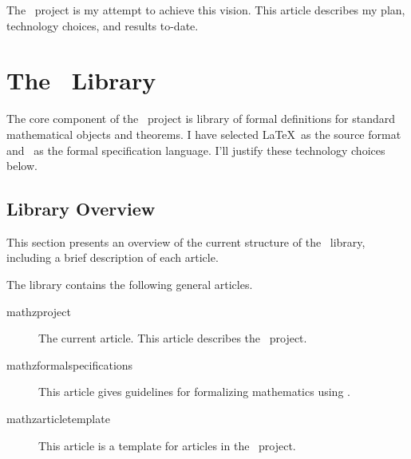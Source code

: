 \documentclass{amsart}
\begin{document}
The \mathz\ project is my attempt to achieve this vision.
This article describes my plan, technology choices, and results to-date.

\section{The \mathz\ Library}

The core component of the \mathz\ project is library of formal definitions for standard mathematical objects and theorems.
I have selected \LaTeX\ as the source format and \ZN\ as the formal specification language.
I'll justify these technology choices below.

\subsection{Library Overview}

This section presents an overview of the current structure of the \mathz\ library, 
including a brief description of each article.

The library contains the following general articles.
\begin{description}
\item[mathz\-project] The current article. This article describes the \mathz\ project.
\item[mathz\-formal\-specifications] This article gives guidelines for formalizing mathematics using \ZN.
\item[mathz\-article\-template] This article is a template for articles in the \mathz\ project.
\end{description}
\end{document}
